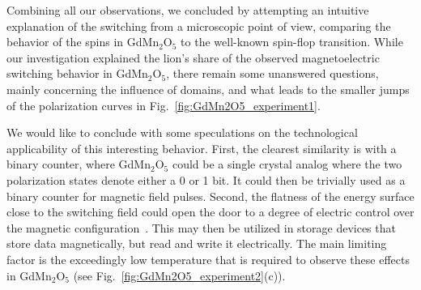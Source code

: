 Combining all our observations, we concluded by attempting an intuitive explanation of the switching from a microscopic point of view, comparing the behavior of the spins in GdMn$_2$O$_5$ to the well-known spin-flop transition.
While our investigation explained the lion's share of the observed magnetoelectric switching behavior in GdMn$_2$O$_5$, there remain some unanswered questions, mainly concerning the influence of domains, and what leads to the smaller jumps of the polarization curves in Fig.~\ref{fig:GdMn2O5_experiment1}.

We would like to conclude with some speculations on the technological applicability of this interesting behavior.
First, the clearest similarity is with a binary counter, where GdMn$_2$O$_5$ could be a single crystal analog where the two polarization states denote either a 0 or 1 bit.
It could then be trivially used as a binary counter for magnetic field pulses.
Second, the flatness of the energy surface close to the switching field could open the door to a degree of electric control over the magnetic configuration~\cite{Radaelli08Y,Oh14}.
This may then be utilized in storage devices that store data magnetically, but read and write it electrically.
The main limiting factor is the exceedingly low temperature that is required to observe these effects in GdMn$_2$O$_5$ (see Fig.~\ref{fig:GdMn2O5_experiment2}(c)).
